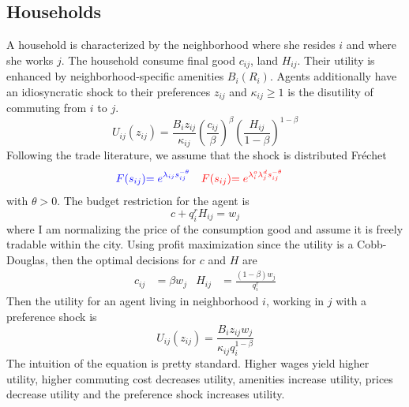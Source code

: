 \documentclass[12pt]{article}
\begin{document}
\subsection{Households}
A household is characterized by the neighborhood where she resides $i$ and where she works $j$. The household consume final good $c_{ij}$, land $H_{ij}$. Their utility is enhanced by neighborhood-specific amenities $B_i(R_i)$. Agents additionally have an idiosyncratic shock to their preferences $z_{ij}$ and $\kappa_{ij}\geq 1$ is the disutility of commuting from $i$ to $j$.  \\ 
\begin{equation}
    U_{ij}(z_{ij}) = \frac{B_iz_{ij}}{\kappa_{ij}}\left(\frac{c_{ij}}{\beta}\right)^{\beta}\left(\frac{H_{ij}}{1-\beta}\right)^{1-\beta}
\end{equation}
Following the trade literature, we assume that the shock is distributed Fréchet 
\begin{align*}
    \textcolor{blue}{F(s_{ij})} &\textcolor{blue}{= e^{\lambda_{ij}s_{ij}^{-\theta}}} & \textcolor{red}{F(s_{ij})} &\textcolor{red}{= e^{\lambda^o_{i}\lambda^d_js_{ij}^{-\theta}}}
\end{align*}
with $\theta>0$. 
The budget restriction for the agent is 
\begin{equation*}
    c + q_i^{r}H_{ij} = w_j
\end{equation*}
where I am normalizing the price of the consumption good and assume it is freely tradable within the city. Using profit maximization since the utility is a Cobb-Douglas, then the optimal decisions for $c$ and $H$ are  
\begin{align*}
    c_{ij} &= \beta w_j & H_{ij}&= \frac{(1-\beta)w_j}{q_i^{r}}
\end{align*}
Then the utility for an agent living in neighborhood $i$, working in $j$ with a preference shock is 
\begin{equation}
    U_{ij}(z_{ij}) = \frac{B_iz_{ij}w_j}{\kappa_{ij}q_{i}^{1-\beta}}
\end{equation}
The intuition of the equation is pretty standard. Higher wages yield higher utility, higher commuting cost decreases utility, amenities increase utility, prices decrease utility and the preference shock increases utility. 
\end{document}
